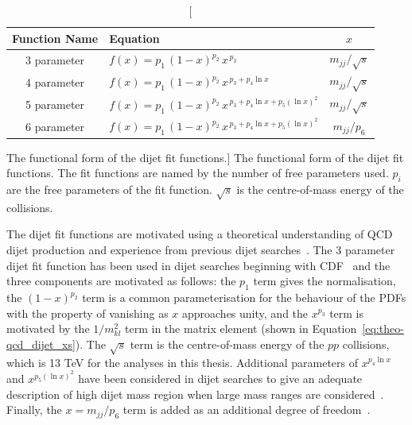 \vspace{-0.5em}
{\renewcommand{\arraystretch}{1.3}
\begin{table}[!thb]
\centering
\begin{tabular}{|c||l|c|}
  \hline
  \textbf{Function Name} & \hspace{2cm} \textbf{Equation}                & \textbf{$x$} \\
  \hline
  3 parameter   & $f(x)=p_1\,(1-x)^{p_2}\,x^{\,p_3}$                       & $m_{jj}/\sqrt{s}$ \\
  4 parameter   & $f(x)=p_1\,(1-x)^{p_2}\,x^{\,p_3+p_4\ln{x}}$               & $m_{jj}/\sqrt{s}$\\
  5 parameter   & $f(x)=p_1\,(1-x)^{p_2}\,x^{\,p_3+p_4\ln{x}+p_5(\ln{x})^{2}}$  & $m_{jj}/\sqrt{s}$\\ 
  6 parameter   & $f(x)=p_1\,(1-x)^{p_2}\,x^{\,p_3+p_4\ln{x}+p_5(\ln{x})^{2}}$  &  $m_{jj}/p_6$\\ 
  \hline
\end{tabular}
\caption
    [The functional form of the dijet fit functions.]
    {The functional form of the dijet fit functions.
      The fit functions are named by the number of free parameters used. $p_{i}$ are the free parameters of the fit function.
      $\sqrt{s}$ is the centre-of-mass energy of the collisions.}
\label{tab:bkg-fit}
\end{table}}
\vspace{-1em}

The dijet fit functions are motivated using a theoretical understanding of QCD dijet production
and experience from previous dijet searches~\cite{theo-dijet_harris}.
The 3 parameter dijet fit function has been used in dijet searches beginning with CDF~\cite{dijet-CDF_3par}
and the three components are motivated as follows:
the $p_1$ term gives the normalisation,
the $(1-x)^{p_2}$ term is a common parameterisation for the behaviour of the PDFs with the property of vanishing as $x$ approaches unity,
and the $x^{p_3}$ term is motivated by the $1/m_{kl}^2$ term in the matrix element (shown in Equation~\ref{eq:theo-qcd_dijet_xs}).
The $\sqrt{s}$ term is the centre-of-mass energy of the $pp$ collisions, which is 13 TeV for the analyses in this thesis.
Additional parameters of $x^{p_4\ln{x}}$ and $x^{p_5(\ln{x})^{2}}$ have been considered in dijet searches to give an adequate description of
high dijet mass region when large mass ranges are considered~\cite{dijet-mori16_paper,dijet-CDF_4par}.
Finally, the $x=m_{jj}/p_6$ term is added as an additional degree of freedom~\cite{det-thesis_kate}.

